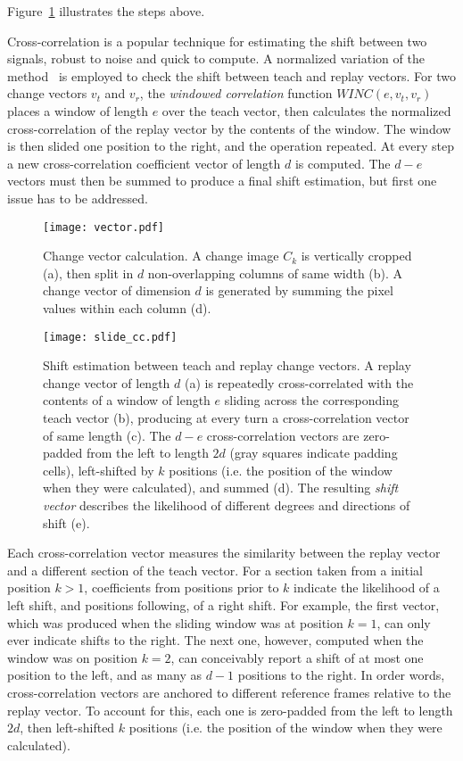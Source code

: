 \documentclass[twocolumn, 9pt,fleqn]{jsproceedings}
\begin{document}
Figure~\ref{fig:vector} illustrates the steps above.

Cross-correlation is a popular technique for estimating the shift between two signals, robust to noise and quick to compute. A normalized variation of the method~\cite{HEL14b} is employed to check the shift between teach and replay vectors. For two change vectors $v_t$ and $v_r$, the \textit{windowed correlation} function $WINC(e, v_t, v_r)$ places a window of length $e$ over the teach vector, then calculates the normalized cross-correlation of the replay vector by the contents of the window. The window is then slided one position to the right, and the operation repeated. At every step a new cross-correlation coefficient vector of length $d$ is computed. The $d - e$ vectors must then be summed to produce a final shift estimation, but first one issue has to be addressed.

\begin{figure}[h!]
\texttt{[image: vector.pdf]}
\caption{Change vector calculation. A change image $C_k$ is vertically cropped (a), then split in $d$ non-overlapping columns of same width (b). A change vector of dimension $d$ is generated by summing the pixel values within each column (d).}
\label{fig:vector}
\end{figure}

\begin{figure}[h!]
\texttt{[image: slide\_cc.pdf]}
\caption{Shift estimation between teach and replay change vectors. A replay change vector of length $d$ (a) is repeatedly cross-correlated with the contents of a window of length $e$ sliding across the corresponding teach vector (b), producing at every turn a cross-correlation vector of same length (c). The $d - e$ cross-correlation vectors are zero-padded from the left to length $2d$ (gray squares indicate padding cells), left-shifted by $k$ positions (i.e. the position of the window when they were calculated), and summed (d). The resulting \textit{shift vector} describes the likelihood of different degrees and directions of shift (e).}
\label{fig:slide_cc}
\end{figure}

Each cross-correlation vector measures the similarity between the replay vector and a different section of the teach vector. For a section taken from a initial position $k > 1$, coefficients from positions prior to $k$ indicate the likelihood of a left shift, and positions following, of a right shift. For example, the first vector, which was produced when the sliding window was at position $k = 1$, can only ever indicate shifts to the right. The next one, however, computed when the window was on position $k = 2$, can conceivably report a shift of at most one position to the left, and as many as $d-1$ positions to the right. In order words, cross-correlation vectors are anchored to different reference frames relative to the replay vector. To account for this, each one is zero-padded from the left to length $2d$, then left-shifted $k$ positions (i.e. the position of the window when they were calculated).
\end{document}
